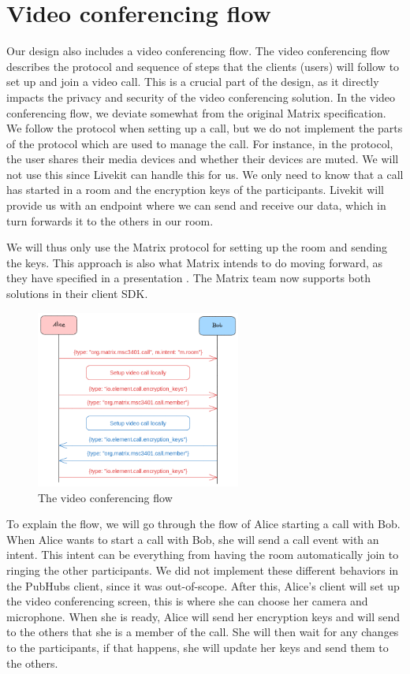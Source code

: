\documentclass{report}
\begin{document}
\section{Video conferencing flow}
Our design also includes a video conferencing flow. The video conferencing flow describes the protocol and sequence
of steps that the clients (users) will follow to set up and join a video call.
This is a crucial part of the design, as it directly impacts the privacy and security of the video conferencing solution.
In the video conferencing flow, we deviate somewhat from the original Matrix specification. We follow the protocol
when setting up a call, but we do not implement the parts of the protocol which are used to manage the call. For
instance, in the protocol, the user shares their media devices and whether their devices are muted. We will not use
this since Livekit can handle this for us. We only need to know that a call has started in a room and the encryption
keys of the participants. Livekit will provide us with an endpoint where we can send and receive our data, which in
turn forwards it to the others in our room.

We will thus only use the Matrix protocol for setting up the room and sending the keys. This approach is also what
Matrix intends to do moving forward, as they have specified in a presentation \cite{nirve_matrixrtc_nodate}. The
Matrix team now supports both solutions in their client SDK.

\begin{figure}
\centering
\includegraphics[width=0.6\textwidth]{img/Callflow.excalidraw.png}
\caption{The video conferencing flow}
\label{fig:video-conference-flow}
\end{figure}

To explain the flow, we will go through the flow of Alice starting a call with Bob.
When Alice wants to start a call with Bob, she will send a call event with an intent. This intent can be
everything from having the room automatically join to ringing the other participants. We did not implement
these different behaviors in the PubHubs client, since it was out-of-scope. After this, Alice's client will set up the
video conferencing screen, this is where she can choose her camera and microphone. When she is ready, Alice will
send her encryption keys and will send to the others that she is a member of the call. She will then wait for any
changes to the participants, if that happens, she will update her keys and send them to the others.
\end{document}
